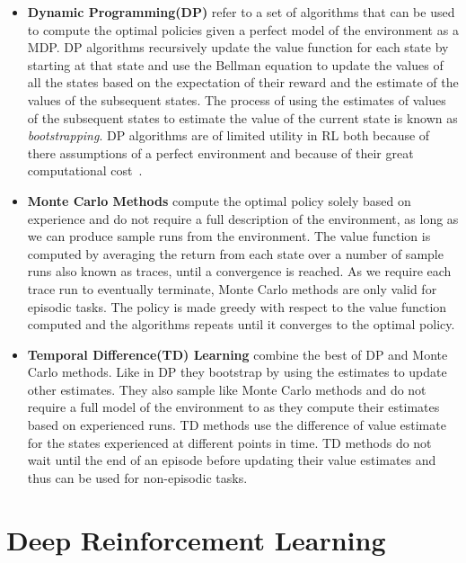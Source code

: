 \begin{itemize}
	\item \textbf{Dynamic Programming(DP)} refer to a set of algorithms that can be used to compute the optimal policies given a perfect model of the environment as a MDP. DP algorithms recursively update the value function for each state by starting at that state and use the Bellman equation to update the values of all the states based on the expectation of their reward and the estimate of the values of the subsequent states. The process of using the estimates of values of the subsequent states to estimate the value of the current state is known as \emph{bootstrapping}. DP algorithms are of limited utility in RL both because of there assumptions of a perfect environment and because of their great computational cost~\cite{sutton2018reinforcement}.
	
	\item \textbf{Monte Carlo Methods} compute the optimal policy solely based on experience and do not require a full description of the environment, as long as we can produce sample runs from the environment. The value function is computed by averaging the return from each state over a number of sample runs also known as traces, until a convergence is reached. As we require each trace run to eventually terminate, Monte Carlo methods are only valid for episodic tasks. The policy is made greedy with respect to the value function computed and the algorithms repeats until it converges to the optimal policy.
	
	
	\item \textbf{Temporal Difference(TD) Learning} combine the best of DP and Monte Carlo methods. Like in DP they bootstrap by using the estimates to update other estimates. They also sample like Monte Carlo methods and do not require a full model of the environment to as they compute their estimates based on experienced runs. TD methods use the difference of value estimate for the states experienced at different points in time. TD methods do not wait until the end of an episode before updating their value estimates and thus can be used for non-episodic tasks.  
\end{itemize}

\section{Deep Reinforcement Learning}

